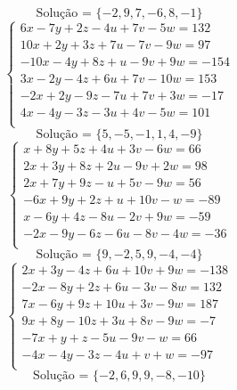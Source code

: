 \documentclass[12pt,oneside,a4paper]{article}
\begin{document}
\begin{equation*}
\text{Solução = }\{-2,9,7,-6,8,-1\}
\end{equation*}
\vspace{\baselineskip}
\begin{equation*}
\begin{cases}
6x-7y+2z-4u+7v-5w=132 \\
10x+2y+3z+7u-7v-9w=97 \\
-10x-4y+8z+u-9v+9w=-154 \\
3x-2y-4z+6u+7v-10w=153 \\
-2x+2y-9z-7u+7v+3w=-17 \\
4x-4y-3z-3u+4v-5w=101 \\
\end{cases}
\end{equation*}
\begin{equation*}
\text{Solução = }\{5,-5,-1,1,4,-9\}
\end{equation*}
\vspace{\baselineskip}
\begin{equation*}
\begin{cases}
x+8y+5z+4u+3v-6w=66 \\
2x+3y+8z+2u-9v+2w=98 \\
2x+7y+9z-u+5v-9w=56 \\
-6x+9y+2z+u+10v-w=-89 \\
x-6y+4z-8u-2v+9w=-59 \\
-2x-9y-6z-6u-8v-4w=-36 \\
\end{cases}
\end{equation*}
\begin{equation*}
\text{Solução = }\{9,-2,5,9,-4,-4\}
\end{equation*}
\vspace{\baselineskip}
\begin{equation*}
\begin{cases}
2x+3y-4z+6u+10v+9w=-138 \\
-2x-8y+2z+6u-3v-8w=132 \\
7x-6y+9z+10u+3v-9w=187 \\
9x+8y-10z+3u+8v-9w=-7 \\
-7x+y+z-5u-9v-w=66 \\
-4x-4y-3z-4u+v+w=-97 \\
\end{cases}
\end{equation*}
\begin{equation*}
\text{Solução = }\{-2,6,9,9,-8,-10\}
\end{equation*}
\end{document}
